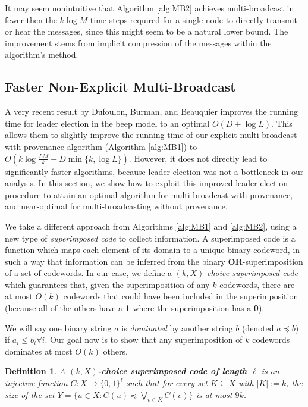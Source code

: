 \documentclass{article}
\newtheorem{definition}[theorem]{Definition}
\begin{document}
It may seem nonintuitive that Algorithm \ref{alg:MB2} achieves multi-broadcast in fewer then the $k \log M$ time-steps required for a single node to directly transmit or hear the messages, since this might seem to be a natural lower bound. The improvement stems from implicit compression of the messages within the algorithm's method.

\subsection{Faster Non-Explicit Multi-Broadcast}
A very recent result by Dufoulon, Burman, and Beauquier \cite{-DBB18} improves the running time for leader election in the beep model to an optimal $O(D+\log L)$. This allows them to slightly improve the running time of our explicit multi-broadcast with provenance algorithm (Algorithm \ref{alg:MB1}) to $O(k\log\frac{LM}{k} + D \min\{k,\log L\})$. However, it does not directly lead to significantly faster algorithms, because leader election was not a bottleneck in our analysis. In this section, we show how to exploit this improved leader election procedure to attain an optimal algorithm for multi-broadcast with provenance, and near-optimal for multi-broadcasting without provenance.

We take a different approach from Algorithms \ref{alg:MB1} and \ref{alg:MB2}, using a new type of \emph{superimposed code} to collect information. A superimposed code is a function which maps each element of its domain to a unique binary codeword, in such a way that information can be inferred from the binary \textbf{OR}-superimposition of a set of codewords. In our case, we define a $(k,X)$-\emph{choice superimposed code} which guarantees that, given the superimposition of any $k$ codewords, there are at most $O(k)$ codewords that could have been included in the superimposition (because all of the others have a \textbf 1 where the superimposition has a \textbf 0). 

We will say one binary string $a$ is \emph{dominated} by another string $b$ (denoted $a\preceq b$) if $a_i\leq b_i \forall i$. Our goal now is to show that any superimposition of $k$ codewords dominates at most $O(k)$ others.

\begin{definition}
	A \textbf{$(k,X)$-choice superimposed code of length $\ell$} is an injective function $C:X\rightarrow \{0,1\}^\ell$ such that for every set $K\subseteq X$ with $|K|:=k$, the size of the set $Y = \{u\in X:C(u)\preceq\bigvee_{v\in K}C(v)\}$ is at most $9k$. 
\end{definition}
\end{document}
